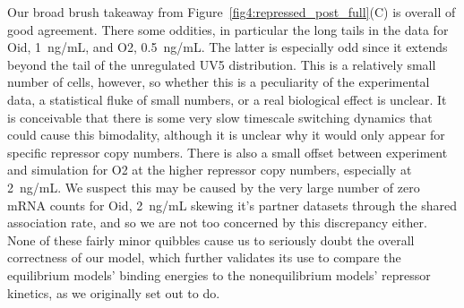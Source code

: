 Our broad brush takeaway from Figure~\ref{fig4:repressed_post_full}(C) is
overall of good agreement. There some oddities, in particular the long tails in
the data for Oid, 1~ng/mL, and O2, 0.5~ng/mL. The latter is especially odd since
it extends beyond the tail of the unregulated UV5 distribution. This is a
relatively small number of cells, however, so whether this is a peculiarity of
the experimental data, a statistical fluke of small numbers, or a real
biological effect is unclear. It is conceivable that there is some very slow
timescale switching dynamics that could cause this bimodality, although it is
unclear why it would only appear for specific repressor copy numbers. There is
also a small offset between experiment and simulation for O2 at the higher
repressor copy numbers, especially at 2~ng/mL. We suspect this may be caused by
the very large number of zero mRNA counts for Oid, 2~ng/mL skewing it's partner
datasets through the shared association rate, and so we are not too concerned by
this discrepancy either. None of these fairly minor quibbles cause us to
seriously doubt the overall correctness of our model, which further validates
its use to compare the equilibrium models' binding energies to the
nonequilibrium models' repressor kinetics, as we originally set out to do.